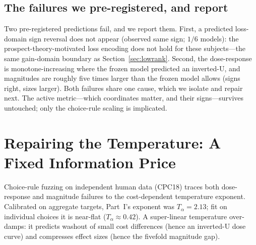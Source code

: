 \documentclass[journal]{IEEEtran}
\begin{document}
\subsection{The failures we pre-registered, and report}
Two pre-registered predictions fail, and we report them.
First, a predicted loss-domain sign reversal does not appear (observed same sign; $1/6$ models): the prospect-theory-motivated loss encoding does not hold for these subjects---the same gain-domain boundary as Section~\ref{sec:lowrank}.
Second, the dose-response is monotone-increasing where the frozen model predicted an inverted-U, and magnitudes are roughly five times larger than the frozen model allows (signs right, sizes larger).
Both failures share one cause, which we isolate and repair next.
The active metric---which coordinates matter, and their signs---survives untouched; only the choice-rule scaling is implicated.

\section{Repairing the Temperature: A Fixed Information Price}
\label{sec:temperature}

Choice-rule fuzzing on independent human data (CPC18) traces both dose-response and magnitude failures to the cost-dependent temperature exponent.
Calibrated on aggregate targets, Part~I's exponent was $T_\alpha=2.13$; fit on individual choices it is near-flat ($T_\alpha\approx0.42$).
A super-linear temperature over-damps: it predicts washout of small cost differences (hence an inverted-U dose curve) and compresses effect sizes (hence the fivefold magnitude gap).
\end{document}
